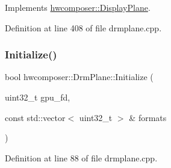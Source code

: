 Implements \mbox{\hyperlink{classhwcomposer_1_1DisplayPlane_a0af461a6ac4beccb8ed21aec933b6eed}{hwcomposer\+::\+Display\+Plane}}.



Definition at line 408 of file drmplane.\+cpp.


\begin{DoxyCode}{0}
\end{DoxyCode}
\mbox{\label{classhwcomposer_1_1DrmPlane_ae6062735cfb8f43881b9f25ad4e8e1a7}} 
\subsubsection{\texorpdfstring{Initialize()}{Initialize()}}
{\footnotesize\ttfamily bool hwcomposer\+::\+Drm\+Plane\+::\+Initialize (\begin{DoxyParamCaption}\item[{uint32\+\_\+t}]{gpu\+\_\+fd,  }\item[{const std\+::vector$<$ uint32\+\_\+t $>$ \&}]{formats }\end{DoxyParamCaption})}



Definition at line 88 of file drmplane.\+cpp.


